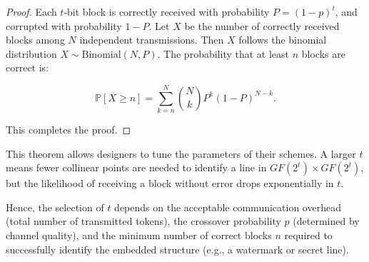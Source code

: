 \documentclass[a4paper,11pt]{llncs}
\begin{document}
\begin{proof}
    Each $t$-bit block is correctly received with probability $P = (1 - p)^t$, and corrupted with probability $1 - P$. Let $X$ be the number of correctly received blocks among $N$ independent transmissions. Then $X$ follows the binomial distribution $X \sim \text{Binomial}(N, P)$. The probability that at least $n$ blocks are correct is:

\[
    \mathbb{P}[X \geq n] = \sum_{k = n}^{N} \binom{N}{k} P^k (1 - P)^{N - k}.
\]

This completes the proof.
\end{proof}

This theorem allows designers to tune the parameters of their schemes. A larger $t$ means fewer collinear points are needed to identify a line in $GF(2^t) \times GF(2^t)$, but the likelihood of receiving a block without error drops exponentially in $t$.

Hence, the selection of $t$ depends on the acceptable communication overhead (total number of transmitted tokens), the crossover probability $p$ (determined by channel quality), and the minimum number of correct blocks $n$ required to successfully identify the embedded structure (e.g., a watermark or secret line).
\end{document}
